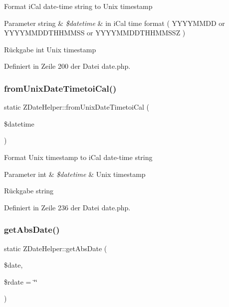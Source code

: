 Format i\+Cal date-\/time string to Unix timestamp


\begin{DoxyParams}[1]{Parameter}
string & {\em \$datetime} & in i\+Cal time format ( Y\+Y\+Y\+Y\+M\+M\+DD or Y\+Y\+Y\+Y\+M\+M\+D\+D\+T\+H\+H\+M\+M\+SS or Y\+Y\+Y\+Y\+M\+M\+D\+D\+T\+H\+H\+M\+M\+S\+SZ )\\
\hline
\end{DoxyParams}
\begin{DoxyReturn}{Rückgabe}
int Unix timestamp 
\end{DoxyReturn}


Definiert in Zeile 200 der Datei date.\+php.

\mbox{\label{class_z_date_helper_aac3b0504ccd4a287890e72c98b0b38b1}} 
\subsubsection{\texorpdfstring{from\+Unix\+Date\+Timetoi\+Cal()}{fromUnixDateTimetoiCal()}}
{\footnotesize\ttfamily static Z\+Date\+Helper\+::from\+Unix\+Date\+Timetoi\+Cal (\begin{DoxyParamCaption}\item[{}]{\$datetime }\end{DoxyParamCaption})\hspace{0.3cm}{\ttfamily [static]}}

Format Unix timestamp to i\+Cal date-\/time string


\begin{DoxyParams}[1]{Parameter}
int & {\em \$datetime} & Unix timestamp\\
\hline
\end{DoxyParams}
\begin{DoxyReturn}{Rückgabe}
string 
\end{DoxyReturn}


Definiert in Zeile 236 der Datei date.\+php.

\mbox{\label{class_z_date_helper_a30f7c4e722fd5947833ab78e6b52e8fa}} 
\subsubsection{\texorpdfstring{get\+Abs\+Date()}{getAbsDate()}}
{\footnotesize\ttfamily static Z\+Date\+Helper\+::get\+Abs\+Date (\begin{DoxyParamCaption}\item[{}]{\$date,  }\item[{}]{\$rdate = {\ttfamily \char`\"{}\char`\"{}} }\end{DoxyParamCaption})\hspace{0.3cm}{\ttfamily [static]}}

